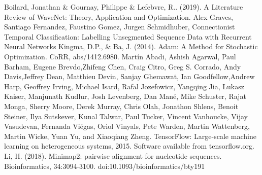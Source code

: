\documentclass[a4paper,11pt,twoside]{report}
\theoremstyle{definition}
\begin{document}
\begin{thebibliography}{20}
 Boilard, Jonathan \& Gournay, Philippe \& Lefebvre, R.. (2019). A Literature Review of WaveNet: Theory, Application and Optimization. 
Alex Graves, Santiago Fernandez, Faustino Gomez, Jurgen Schmidhuber, Connectionist Temporal Classification: Labelling Unsegmented Sequence Data with Recurrent Neural Networks
Kingma, D.P., \& Ba, J. (2014). Adam: A Method for Stochastic Optimization. CoRR, abs/1412.6980.
Martín Abadi, Ashish Agarwal, Paul Barham, Eugene Brevdo,Zhifeng Chen, Craig Citro, Greg S. Corrado, Andy Davis,Jeffrey Dean, Matthieu Devin, Sanjay Ghemawat, Ian Goodfellow,Andrew Harp, Geoffrey Irving, Michael Isard, Rafal Jozefowicz, Yangqing Jia, Lukasz Kaiser, Manjunath Kudlur, Josh Levenberg, Dan Mané, Mike Schuster, Rajat Monga, Sherry Moore, Derek Murray, Chris Olah, Jonathon Shlens, Benoit Steiner, Ilya Sutskever, Kunal Talwar, Paul Tucker, Vincent Vanhoucke, Vijay Vasudevan, Fernanda Viégas, Oriol Vinyals, Pete Warden, Martin Wattenberg, Martin Wicke, Yuan Yu, and Xiaoqiang Zheng. TensorFlow: Large-scale machine learning on heterogeneous systems, 2015. Software available from tensorflow.org.
 Li, H. (2018). Minimap2: pairwise alignment for nucleotide sequences. Bioinformatics, 34:3094-3100. doi:10.1093/bioinformatics/bty191
\end{thebibliography}

\thispagestyle{empty}




\listoffigures
\thispagestyle{empty}


\renewcommand{\listtablename}{Spis tabel}
\listoftables
\thispagestyle{empty}



\thispagestyle{empty}
\end{document}
